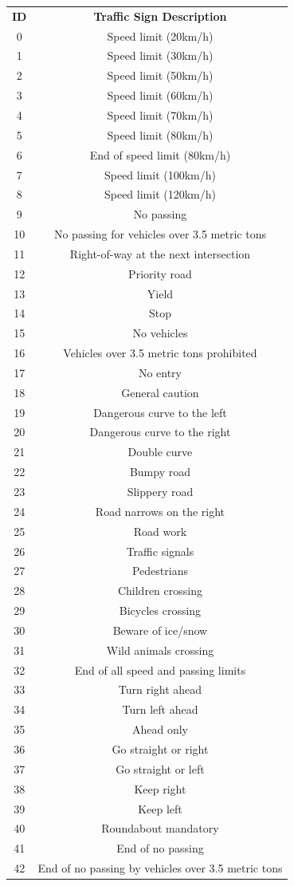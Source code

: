 \begin{center}
\begin{tabular}{ c c }
\textbf{ID} & \textbf{Traffic Sign Description} \\
0 & Speed limit (20km/h) \\
1 & Speed limit (30km/h) \\
2 & Speed limit (50km/h) \\
3 & Speed limit (60km/h) \\
4 & Speed limit (70km/h) \\
5 & Speed limit (80km/h) \\
6 & End of speed limit (80km/h) \\
7 & Speed limit (100km/h) \\
8 & Speed limit (120km/h) \\
9 & No passing \\
10 & No passing for vehicles over 3.5 metric tons \\
11 & Right-of-way at the next intersection \\
12 & Priority road \\
13 & Yield \\
14 & Stop \\
15 & No vehicles \\
16 & Vehicles over 3.5 metric tons prohibited \\
17 & No entry \\
18 & General caution \\
19 & Dangerous curve to the left \\
20 & Dangerous curve to the right \\
21 & Double curve \\
22 & Bumpy road \\
23 & Slippery road \\
24 & Road narrows on the right \\
25 & Road work \\
26 & Traffic signals \\
27 & Pedestrians \\
28 & Children crossing \\
29 & Bicycles crossing \\
30 & Beware of ice/snow \\
31 & Wild animals crossing \\
32 & End of all speed and passing limits \\
33 & Turn right ahead \\
34 & Turn left ahead \\
35 & Ahead only \\
36 & Go straight or right \\
37 & Go straight or left \\
38 & Keep right \\
39 & Keep left \\
40 & Roundabout mandatory \\
41 & End of no passing \\
42 & End of no passing by vehicles over 3.5 metric tons \\
\end{tabular}
\end{center}
